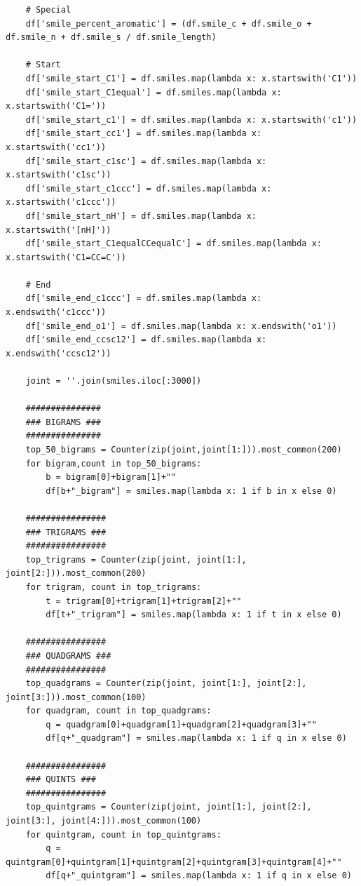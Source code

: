 \documentclass[]{article}
\begin{document}
\begin{flushleft}
\begin{lstlisting}
    # Special
    df['smile_percent_aromatic'] = (df.smile_c + df.smile_o + df.smile_n + df.smile_s / df.smile_length)

    # Start
    df['smile_start_C1'] = df.smiles.map(lambda x: x.startswith('C1'))
    df['smile_start_C1equal'] = df.smiles.map(lambda x: x.startswith('C1='))
    df['smile_start_c1'] = df.smiles.map(lambda x: x.startswith('c1'))
    df['smile_start_cc1'] = df.smiles.map(lambda x: x.startswith('cc1'))
    df['smile_start_c1sc'] = df.smiles.map(lambda x: x.startswith('c1sc'))
    df['smile_start_c1ccc'] = df.smiles.map(lambda x: x.startswith('c1ccc'))
    df['smile_start_nH'] = df.smiles.map(lambda x: x.startswith('[nH]'))
    df['smile_start_C1equalCCequalC'] = df.smiles.map(lambda x: x.startswith('C1=CC=C'))

    # End
    df['smile_end_c1ccc'] = df.smiles.map(lambda x: x.endswith('c1ccc'))
    df['smile_end_o1'] = df.smiles.map(lambda x: x.endswith('o1'))
    df['smile_end_ccsc12'] = df.smiles.map(lambda x: x.endswith('ccsc12'))
    
    joint = ''.join(smiles.iloc[:3000])
    
    ###############
    ### BIGRAMS ###
    ###############
    top_50_bigrams = Counter(zip(joint,joint[1:])).most_common(200)
    for bigram,count in top_50_bigrams:
        b = bigram[0]+bigram[1]+""
        df[b+"_bigram"] = smiles.map(lambda x: 1 if b in x else 0)
        
    ################
    ### TRIGRAMS ###
    ################
    top_trigrams = Counter(zip(joint, joint[1:], joint[2:])).most_common(200)
    for trigram, count in top_trigrams:
        t = trigram[0]+trigram[1]+trigram[2]+""
        df[t+"_trigram"] = smiles.map(lambda x: 1 if t in x else 0)
        
    ################
    ### QUADGRAMS ###
    ################
    top_quadgrams = Counter(zip(joint, joint[1:], joint[2:], joint[3:])).most_common(100)
    for quadgram, count in top_quadgrams:
        q = quadgram[0]+quadgram[1]+quadgram[2]+quadgram[3]+""
        df[q+"_quadgram"] = smiles.map(lambda x: 1 if q in x else 0)
        
    ################
    ### QUINTS ###
    ################
    top_quintgrams = Counter(zip(joint, joint[1:], joint[2:], joint[3:], joint[4:])).most_common(100)
    for quintgram, count in top_quintgrams:
        q = quintgram[0]+quintgram[1]+quintgram[2]+quintgram[3]+quintgram[4]+""
        df[q+"_quintgram"] = smiles.map(lambda x: 1 if q in x else 0)
    

\end{lstlisting}
\end{flushleft}
\end{document}
